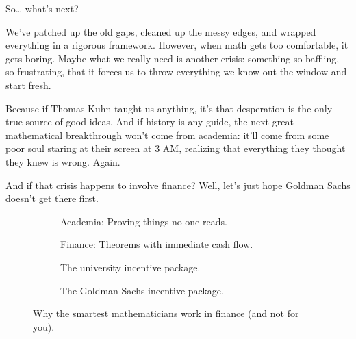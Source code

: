 So… what’s next? 

We’ve patched up the old gaps, cleaned up the messy edges, and wrapped everything in a rigorous framework. However, when math gets too comfortable, it gets boring. Maybe what we really need is another crisis: something so baffling, so frustrating, that it forces us to throw everything we know out the window and start fresh. 

Because if Thomas Kuhn taught us anything, it’s that desperation is the only true source of good ideas. And if history is any guide, the next great mathematical breakthrough won’t come from academia: it’ll come from some poor soul staring at their screen at 3 AM, realizing that everything they thought they knew is wrong. Again. 

And if that crisis happens to involve finance? Well, let’s just hope Goldman Sachs doesn’t get there first. 


\begin{figure}[H]
\centering

\begin{subfigure}[t]{0.45\textwidth}
\centering
{}
\caption*{Academia: Proving things no one reads.}
\end{subfigure}
\hfill
\begin{subfigure}[t]{0.45\textwidth}
\centering
{}
\caption*{Finance: Theorems with immediate cash flow.}
\end{subfigure}

\vspace{1em}

\begin{subfigure}[t]{0.45\textwidth}
\centering
{}
\caption*{The university incentive package.}
\end{subfigure}
\hfill
\begin{subfigure}[t]{0.45\textwidth}
\centering
{}
\caption*{The Goldman Sachs incentive package.}
\end{subfigure}

\caption{Why the smartest mathematicians work in finance (and not for you).}
\end{figure}


